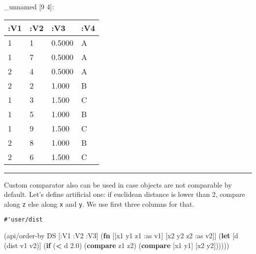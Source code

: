 \documentclass[]{article}
\newenvironment{Shaded}{\begin{snugshade}}{\end{snugshade}}
\newcommand{\KeywordTok}[1]{\textcolor[rgb]{0.13,0.29,0.53}{\textbf{#1}}}
\newcommand{\FloatTok}[1]{\textcolor[rgb]{0.00,0.00,0.81}{#1}}
\newcommand{\FunctionTok}[1]{\textcolor[rgb]{0.00,0.00,0.00}{#1}}
\newcommand{\VariableTok}[1]{\textcolor[rgb]{0.00,0.00,0.00}{#1}}
\newcommand{\BuiltInTok}[1]{#1}
\newcommand{\AttributeTok}[1]{\textcolor[rgb]{0.77,0.63,0.00}{#1}}
\newcommand{\NormalTok}[1]{#1}
\begin{document}
\_unnamed {[}9 4{]}:

\begin{longtable}[]{@{}llll@{}}
\toprule
:V1 & :V2 & :V3 & :V4\tabularnewline
\midrule
\endhead
1 & 1 & 0.5000 & A\tabularnewline
1 & 7 & 0.5000 & A\tabularnewline
2 & 4 & 0.5000 & A\tabularnewline
2 & 2 & 1.000 & B\tabularnewline
1 & 3 & 1.500 & C\tabularnewline
1 & 5 & 1.000 & B\tabularnewline
1 & 9 & 1.500 & C\tabularnewline
2 & 8 & 1.000 & B\tabularnewline
2 & 6 & 1.500 & C\tabularnewline
\bottomrule
\end{longtable}

\begin{center}\rule{0.5\linewidth}{0.5pt}\end{center}

Custom comparator also can be used in case objects are not comparable by
default. Let's define artificial one: if euclidean distance is lower
than 2, compare along \texttt{z} else along \texttt{x} and \texttt{y}.
We use first three columns for that.

\begin{Shaded}
\end{Shaded}

\begin{verbatim}
#'user/dist
\end{verbatim}

\begin{Shaded}
\begin{Highlighting}[]
\NormalTok{(api/order-by DS [}\AttributeTok{:V1} \AttributeTok{:V2} \AttributeTok{:V3}\NormalTok{] (}\KeywordTok{fn}\NormalTok{ [[x1 y1 z1 }\AttributeTok{:as}\NormalTok{ v1] [x2 y2 z2 }\AttributeTok{:as}\NormalTok{ v2]]}
\NormalTok{                                 (}\KeywordTok{let}\NormalTok{ [d (dist v1 v2)]}
\NormalTok{                                   (}\KeywordTok{if}\NormalTok{ (}\KeywordTok{<}\NormalTok{ d }\FloatTok{2.0}\NormalTok{)}
\NormalTok{                                     (}\KeywordTok{compare}\NormalTok{ z1 z2)}
\NormalTok{                                     (}\KeywordTok{compare}\NormalTok{ [x1 y1] [x2 y2])))))}
\end{Highlighting}
\end{Shaded}
\end{document}
